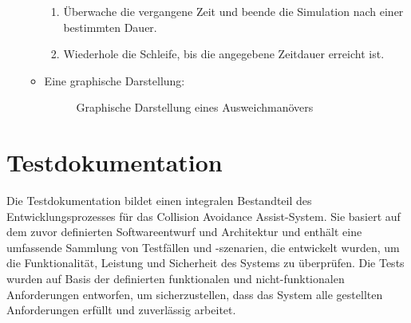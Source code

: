 \begin{enumerate}
\begin{itemize}
\begin{enumerate}
			\item Überwache die vergangene Zeit und beende die Simulation nach einer bestimmten Dauer.
			\item Wiederhole die Schleife, bis die angegebene Zeitdauer erreicht ist.
		\end{enumerate}
		\item Eine graphische Darstellung:
		\begin{figure}[H]
			\centering
			\qquad
			\caption{Graphische Darstellung eines Ausweichmanövers}%
			\label{fig:manoever}%
		\end{figure}
	\end{itemize}
\end{enumerate}

\section{Testdokumentation}
Die Testdokumentation bildet einen integralen Bestandteil des Entwicklungsprozesses für das Collision Avoidance Assist-System. Sie basiert auf dem zuvor definierten Softwareentwurf und Architektur und enthält eine umfassende Sammlung von Testfällen und -szenarien, die entwickelt wurden, um die Funktionalität, Leistung und Sicherheit des Systems zu überprüfen. Die Tests wurden auf Basis der definierten funktionalen und nicht-funktionalen Anforderungen entworfen, um sicherzustellen, dass das System alle gestellten Anforderungen erfüllt und zuverlässig arbeitet.
